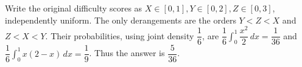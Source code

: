 Write the original difficulty scores as $X\in[0,1],Y\in[0,2],Z\in[0,3]$, independently uniform. The only derangements are the orders $Y<Z<X$ and $Z<X<Y$. Their probabilities, using joint density $\dfrac{1}{6}$, are $\dfrac{1}{6}\int_0^1\dfrac{x^2}{2}\,dx=\dfrac{1}{36}$ and $\dfrac{1}{6}\int_0^1x(2-x)\,dx=\dfrac{1}{9}$. Thus the answer is $\boxed{\dfrac{5}{36}}$.
